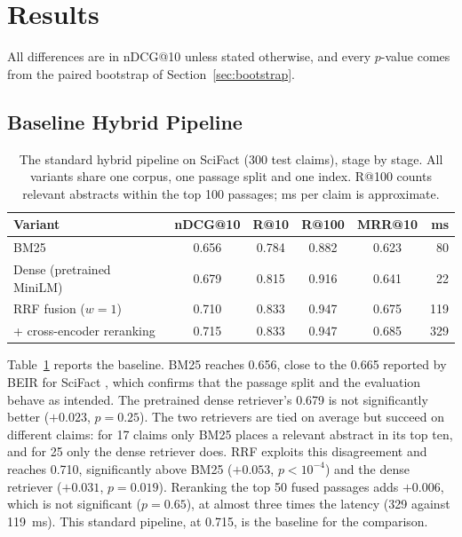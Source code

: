 \section{Results}
\label{sec:results}

All differences are in nDCG@10 unless stated otherwise, and every $p$-value comes from the
paired bootstrap of Section~\ref{sec:bootstrap}.

\subsection{Baseline Hybrid Pipeline}
\label{sec:res-baseline}

\begin{table}[t]
\centering\small
\caption{The standard hybrid pipeline on SciFact (300 test claims), stage by stage. All variants
share one corpus, one passage split and one index. R@100 counts relevant abstracts within the
top 100 passages; ms per claim is approximate.}
\label{tab:ablation}
\begin{tabular}{@{}lccccr@{}}
\toprule
Variant & nDCG@10 & R@10 & R@100 & MRR@10 & ms \\
\midrule
BM25            & 0.656 & 0.784 & 0.882 & 0.623 & 80 \\
Dense (pretrained MiniLM) & 0.679 & 0.815 & 0.916 & 0.641 & 22 \\
RRF fusion ($w = 1$) & 0.710 & 0.833 & 0.947 & 0.675 & 119 \\
\; + cross-encoder reranking & 0.715 & 0.833 & 0.947 & 0.685 & 329 \\
\bottomrule
\end{tabular}
\end{table}

Table~\ref{tab:ablation} reports the baseline. BM25 reaches 0.656, close to the 0.665 reported by
BEIR for SciFact \parencite{thakur2021beir}, which confirms that the passage split and the
evaluation behave as intended. The pretrained dense retriever's 0.679 is not significantly
better ($+0.023$, $p = 0.25$). The two retrievers are tied on average but succeed on different
claims: for 17 claims only BM25 places a relevant abstract in its top ten, and for 25 only the
dense retriever does. RRF exploits this disagreement and reaches 0.710, significantly above BM25
($+0.053$, $p < 10^{-4}$) and the dense retriever ($+0.031$, $p = 0.019$). Reranking the top 50
fused passages adds $+0.006$, which is not significant ($p = 0.65$), at almost three times the
latency (329 against 119~ms). This standard pipeline, at 0.715, is the baseline for the
comparison.

